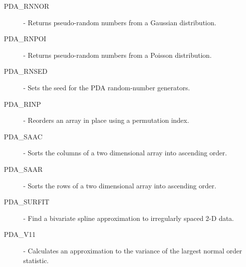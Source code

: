 \documentclass[11pt,twoside,nolof]{starlink}
\begin{document}
\begin{itemize}
\begin{description}
\item [PDA\_RNNOR] - Returns pseudo-random numbers from a Gaussian distribution.
\item [PDA\_RNPOI] - Returns pseudo-random numbers from a Poisson distribution.
\item [PDA\_RNSED] - Sets the seed for the PDA random-number generators.
\item [PDA\_RINP] - Reorders an array in place using a permutation index.
\item [PDA\_SAAC] - Sorts the columns of a two dimensional array into ascending order.
\item [PDA\_SAAR] - Sorts the rows of a two dimensional array into ascending order.
\item [PDA\_SURFIT] - Find a bivariate spline approximation to irregularly spaced 2-D data.
\item [PDA\_V11] - Calculates an approximation to the variance of the largest normal order statistic.

\end{description}
\end{itemize}


\sloppy\twocolumn

\end{document}
